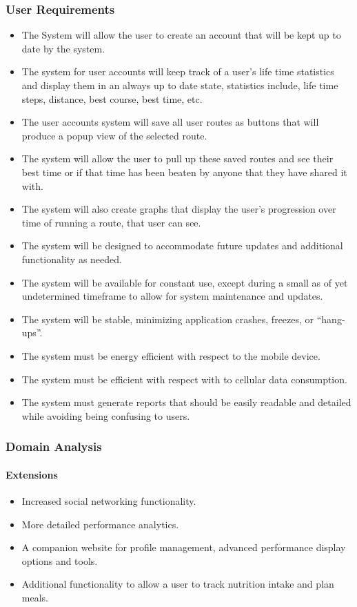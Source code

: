 ﻿\documentclass{article}
\begin{document}
\subsubsection{User Requirements}
\begin{itemize}
    \item The System will allow the user to create an account that will be kept up to date by the system.
    \item The system for user accounts will keep track of a user's life time statistics and display them in an always up to date state, statistics include, life time steps, distance, best course, best time, etc.
    \item The user accounts system will save all user routes as buttons that will produce a popup view of the selected route.
    \item The system will allow the user to pull up these saved routes and see their best time or if that time has been beaten by anyone that they have shared it with.
    \item The system will also create graphs that display the user’s progression over time of running a route, that user can see.
    \item The system will be designed to accommodate future updates and additional functionality as needed.
    \item The system will be available for constant use, except during a small as of yet undetermined timeframe to allow for system maintenance and updates.
    \item The system will be stable, minimizing application crashes, freezes, or “hang-ups”.
    \item The system must be energy efficient with respect to the mobile device.
    \item The system must be efficient with respect with to cellular data consumption.
    \item The system must generate reports that should be easily readable and detailed while avoiding being confusing to users.

\end{itemize}

\subsubsection{Domain Analysis}
\paragraph{Extensions}
\begin{itemize}
    \item Increased social networking functionality.
    \item More detailed performance analytics.
    \item A companion website for profile management, advanced performance display options and tools.
    \item Additional functionality to allow a user to track nutrition intake and plan meals.
\end{itemize}
\end{document}

